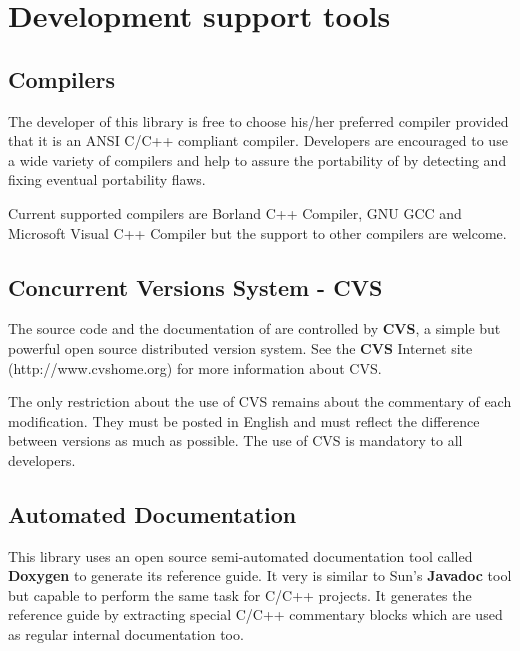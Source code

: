 \section{Development support tools}
\label{sec:coding.tools}

\subsection{Compilers}
\label{sec:coding.compilers}

The developer of this library is free to choose his/her preferred compiler provided that it is an ANSI C/C++ compliant compiler. Developers are encouraged to use a wide variety of compilers and help to assure the portability of \libname{ } by detecting and fixing eventual portability flaws. 

Current supported compilers are Borland C++ Compiler, GNU GCC and Microsoft Visual C++ Compiler but the support to other compilers are welcome.

\subsection{Concurrent Versions System - CVS}
\label{sec:coding.cvs}

The source code and the documentation of \libname{ }are controlled by {\bf CVS}, a simple but powerful open source distributed version system. See the {\bf CVS} Internet site (http://www.cvshome.org) for more information about CVS.

The only restriction about the use of CVS remains about the commentary of each modification. They must be posted in English and must reflect the difference between versions as much as possible. The use of CVS is mandatory to all developers.

\subsection{Automated Documentation}
\label{sec:coding.doxygen}

This library uses an open source semi-automated documentation tool called {\bf Doxygen} to generate its reference guide. It very is similar to Sun's {\bf Javadoc} tool but capable to perform the same task for C/C++ projects. It generates the reference guide by extracting special C/C++ commentary blocks which are used as regular internal documentation too.

